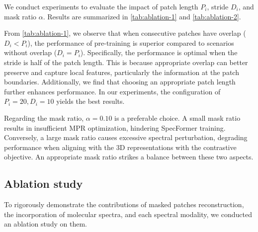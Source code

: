 We conduct experiments to evaluate the impact of patch length $P_i$, stride $D_i$, and mask ratio $\alpha$. Results are summarized in \cref{tab:ablation-1} and \cref{tab:ablation-2}.

From \cref{tab:ablation-1}, we observe that when consecutive patches have overlap ($D_i<P_i$), the performance of pre-training is superior compared to scenarios without overlap ($D_i=P_i$). Specifically, the performance is optimal when the stride is half of the patch length. This is because appropriate overlap can better preserve and capture local features, particularly the information at the patch boundaries. 
Additionally, we find that choosing an appropriate patch length further enhances performance. In our experiments, the configuration of $P_i=20, D_i=10$ {yields} the best results.

Regarding the mask ratio, $\alpha=0.10$ is a preferable choice. A small mask ratio results in insufficient MPR optimization, hindering SpecFormer training. Conversely, a large mask ratio causes excessive spectral perturbation, degrading performance when aligning with the 3D representations with the contrastive objective. An appropriate mask ratio strikes a balance between these two aspects.

\subsection{{Ablation study}}
{To rigorously demonstrate the contributions of masked patches reconstruction, the incorporation of molecular spectra, and each spectral modality, 
we conducted an ablation study on them.}

